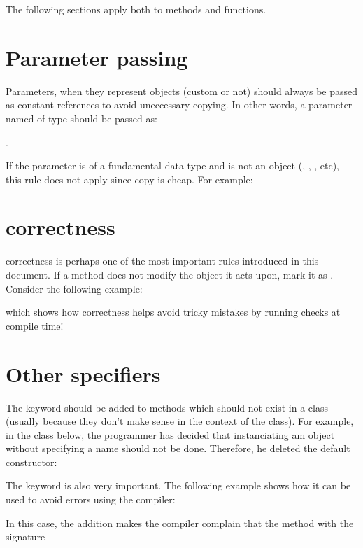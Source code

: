 The following sections apply both to methods and functions.

\section{Parameter passing}
Parameters, when they represent objects (custom or not) should always be passed 
as constant references to avoid uneccessary copying. In other words, a 
parameter named  of type  should be passed as:

\begin{center}
.
\end{center}

If the parameter is of a fundamental data type and is not an object (, 
, , etc), this rule does not apply since copy is cheap. 
For example:


\section{ correctness}
 correctness is perhaps one of the most important rules introduced 
in this document. If a method does not modify the object it acts upon, mark it 
as . Consider the following example:

which shows how  correctness helps avoid tricky mistakes by running 
checks at compile time!

\section{Other specifiers}
The  keyword should be added to methods which should not exist in a 
class (usually because they don't make sense in the context of the class). For 
example, in the class  below, the programmer has decided that 
instanciating am object without specifying a name should not be done. 
Therefore, he deleted the default constructor:


The  keyword is also very important. The following example shows 
how it can be used to avoid errors using the compiler:

In this case, the  addition makes the compiler complain that the 
method with the signature


